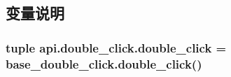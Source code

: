 \subsection{变量说明}
\hypertarget{namespaceapi_1_1double__click_a7e176c406c07250aa8a83bf02b22af29}{
\subsubsection[{double\-\_\-click}]{\setlength{\rightskip}{0pt plus 5cm}tuple api.\-double\-\_\-click.\-double\-\_\-click = base\-\_\-double\-\_\-click.\-double\-\_\-click()}}\label{namespaceapi_1_1double__click_a7e176c406c07250aa8a83bf02b22af29}
